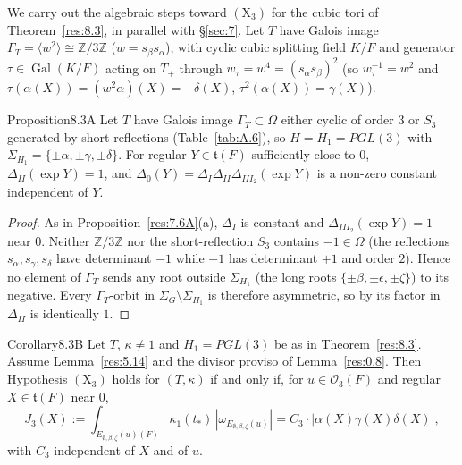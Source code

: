 \documentclass[12pt,letterpaper]{amsart}
\theoremstyle{plain}
\theoremstyle{definition}
\theoremstyle{remark}
\theoremstyle{definition}
\newcommand{\zzz}{\mathbb{Z}}
\DeclareMathOperator{\Gal}{Gal}
\begin{document}
We carry out the algebraic steps toward $(\mathrm X_3)$ for the cubic tori of
Theorem~\ref{res:8.3}, in parallel with \S\ref{sec:7}. Let $T$ have Galois image
$\Gamma_T=\langle w^2\rangle\cong\zzz/3\zzz$ ($w=s_\beta s_\alpha$), with cyclic
cubic splitting field $K/F$ and generator $\tau\in\Gal(K/F)$ acting on $T_+$
through $w_\tau=w^4=(s_\alpha s_\beta)^2$ (so $w_\tau^{-1}=w^2$ and
$\tau(\alpha(X))=(w^2\alpha)(X)=-\delta(X)$, $\tau^2(\alpha(X))=\gamma(X)$).

\begin{res}{Proposition}{8.3A}\label{res:8.3A}
Let $T$ have Galois image $\Gamma_T\subset\Omega$ either cyclic of order $3$ or
$S_3$ generated by short reflections (Table~\ref{tab:A.6}), so $H=H_1=PGL(3)$
with $\Sigma_{H_1}=\{\pm\alpha,\pm\gamma,\pm\delta\}$. For regular
$Y\in\mathfrak t(F)$ sufficiently close to $0$, $\Delta_{II}(\exp Y)=1$, and
$\Delta_0(Y)=\Delta_I\Delta_{II}\Delta_{III_2}(\exp Y)$ is a non-zero constant
independent of $Y$.
\end{res}

\begin{proof}
As in Proposition~\ref{res:7.6A}(a), $\Delta_I$ is constant and
$\Delta_{III_2}(\exp Y)=1$ near $0$. Neither $\zzz/3\zzz$ nor the short-reflection
$S_3$ contains $-1\in\Omega$ (the reflections $s_\alpha,s_\gamma,s_\delta$ have
determinant $-1$ while $-1$ has determinant $+1$ and order $2$). Hence no element
of $\Gamma_T$ sends any root outside $\Sigma_{H_1}$ (the long roots
$\{\pm\beta,\pm\epsilon,\pm\zeta\}$) to its negative. Every $\Gamma_T$-orbit in
$\Sigma_G\setminus\Sigma_{H_1}$ is therefore asymmetric, so by
\cite[(2.2), Lemma~3.2.C]{LS87} its factor in $\Delta_{II}$ is identically $1$.
\end{proof}

\begin{res}{Corollary}{8.3B}\label{res:8.3B}
Let $T$, $\kappa\neq1$ and $H_1=PGL(3)$ be as in Theorem~\ref{res:8.3}. Assume
Lemma~\ref{res:5.14} and the divisor proviso of Lemma~\ref{res:0.8}. Then
Hypothesis $(\mathrm X_3)$ holds for $(T,\kappa)$ if and only if, for
$u\in\mathcal O_3(F)$ and regular $X\in\mathfrak t(F)$ near $0$,
\begin{equation}\tag{8.7a}\label{eq:8.7a}
J_3(X):=\int_{E_{\emptyset,\beta,\zeta}(u)(F)}\kappa_1(t_*)\,
|\omega_{E_{\emptyset,\beta,\zeta}(u)}|
=C_3\cdot|\alpha(X)\gamma(X)\delta(X)|,
\end{equation}
with $C_3$ independent of $X$ and of $u$.
\end{res}
\end{document}
